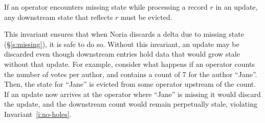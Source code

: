 
%
%
%

\begin{invariant}
  \label{i:missing-suffix}
  If an operator encounters missing state while processing a record $r$ in an
  update, any downstream state that reflects $r$ must be evicted.
\end{invariant}

This invariant ensures that when Noria discards a delta due to missing state
(\S\ref{s:missing}), it is safe to do so. Without this invariant, an update may
be discarded even though downstream entries hold data that would grow stale
without that update. For example, consider what happens if an operator counts
the number of votes per author, and contains a count of 7 for the author
``Jane''. Then, the state for ``Jane'' is evicted from some operator upstream of
the count. If an update now arrives at the operator where ``Jane'' is missing it
would discard the update, and the downstream count would remain perpetually
stale, violating Invariant~\ref{i:no-holes}.

